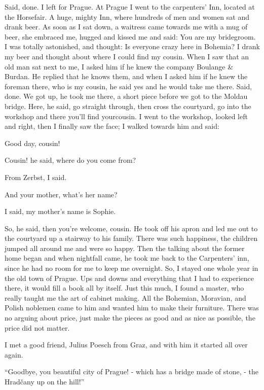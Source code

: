 \documentclass{article}
\begin{document}
Said, done. I left for Prague. At Prague I went to the carpenters' Inn, located at the Horsefair. A huge, mighty Inn, where hundreds of men and women sat and drank beer. As soon as I sat down, a waitress came towards me with a mug of beer, she embraced me, hugged and kissed me and said: You are my bridegroom. I was totally astonished, and thought: Is everyone crazy here in Bohemia? I drank my beer and thought about where I could find my cousin. When I saw that an old man sat next to me, I asked him if he knew the company Boulange \& Burdan. He replied that he knows them, and when I asked him if he knew the foreman there, who is my cousin, he said yes and he would take me there. Said, done. We got up, he took me there, a short piece before we got to the Moldau bridge. Here, he said, go straight through, then cross the courtyard, go into the workshop and there you'll find yourcousin. I went to the workshop, looked left and right, then I finally saw the face; I walked towards him and said:

Good day, cousin!

Cousin! he said, where do you come from?

From Zerbst, I said.

And your mother, what's her name?

I said, my mother's name is Sophie.

So, he said, then you're welcome, cousin. He took off his apron and led me out to the courtyard up a stairway to his family. There was such happiness, the children jumped all around me and were so happy. Then the talking about the former home began and when nightfall came, he took me back to the Carpenters' inn, since he had no room for me to keep me overnight. So, I stayed one whole year in the old town of Prague. Ups and downs and everything that I had to experience there, it would fill a book all by itself. Just this much, I found a master, who really taught me the art of cabinet making. All the Bohemian, Moravian, and Polish noblemen came to him and wanted him to make their furniture. There was no arguing about price, just make the pieces as good and as nice as possible, the price did not matter.

I met a good friend, Julius Poesch from Graz, and with him it started all over again.

``Goodbye, you beautiful city of Prague! - which has a bridge made of stone, - the Hradčany up on the hill!''
\end{document}
